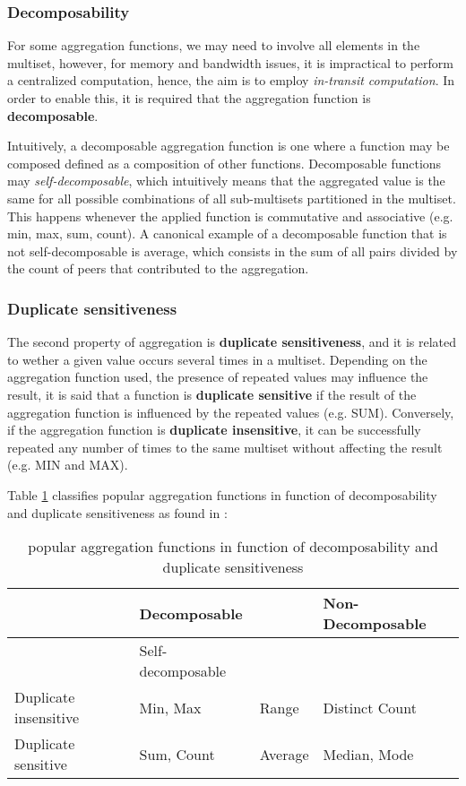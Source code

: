 \subsubsection*{Decomposability}

For some aggregation functions, we may need to involve all elements in the multiset, however, for memory and bandwidth issues, it is impractical to perform a centralized computation, hence, the aim is to employ \textit{in-transit computation}. In order to enable this, it is required that the aggregation function is \textbf{decomposable}. 

Intuitively, a decomposable aggregation function is one where a function may be composed defined as a composition of other functions. Decomposable functions may \textit{self-decomposable}, which intuitively means that the aggregated value is the same for all possible combinations of all sub-multisets partitioned in the multiset. This happens whenever the applied function is commutative and associative (e.g. min, max, sum, count). A canonical example of a decomposable function that is not self-decomposable is average, which consists in the sum of all pairs divided by the count of peers that contributed to the aggregation.

\subsubsection*{Duplicate sensitiveness}

The second property of aggregation is \textbf{duplicate sensitiveness}, and it is related to wether a given value occurs several times in a multiset. Depending on the aggregation function used, the presence of repeated values may influence the result, it is said that a function is \textbf{duplicate sensitive} if the result of the aggregation function is influenced by the repeated values (e.g. SUM). Conversely, if the aggregation function is \textbf{duplicate insensitive}, it can be successfully repeated any number of times to the same multiset without affecting the result (e.g. MIN and MAX).

Table \ref{table:aggregation_functions} classifies popular aggregation functions in function of decomposability and duplicate sensitiveness as found in \cite{DBLP:journals/corr/abs-1110-0725}:

\begin{table}[]
    \begin{tabular}{|l|l|l|l|}
    \hline
                          & \multicolumn{2}{l|}{Decomposable} & Non-Decomposable  \\ \hline
                          & Self-decomposable    &                             &  \\ \hline
    Duplicate insensitive & Min, Max             & Range     & Distinct Count    \\ \hline
    Duplicate sensitive   & Sum, Count           & Average   & Median, Mode     \\ \hline
    \end{tabular}
    \caption{popular aggregation functions in function of decomposability and duplicate sensitiveness}
    \label{table:aggregation_functions}
\end{table}

